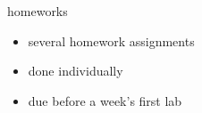 

\begin{frame}{homeworks}
    \begin{itemize}
    \item several homework assignments
    \item done individually
    \item due before a week's first lab
    \end{itemize}
\end{frame}
